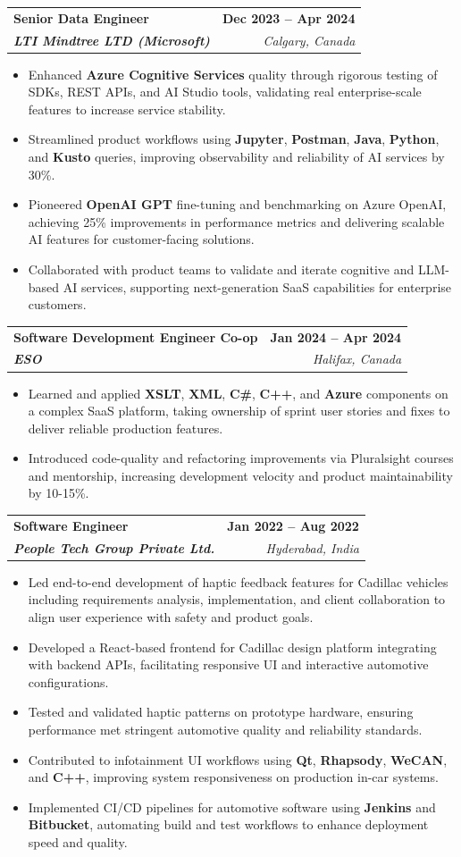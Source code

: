 \documentclass[letterpaper,11pt]{article}
\makeatletter
\newcommand{\resumeItem}[1]{
  \item\small{
    {#1 \vspace{-2pt}}
  }
}
\newcommand{\resumeSubheading}[4]{
  \vspace{-2pt}\item
    \begin{tabular*}{1.0\textwidth}[t]{l@{\extracolsep{\fill}}r}
      \textbf{#1} & \textbf{\small #2} \\
      \textit{\small#3} & \textit{\small #4} \\
    \end{tabular*}\vspace{-7pt}
}
\newcommand{\resumeItemListStart}{\begin{itemize}}
\newcommand{\resumeItemListEnd}{\end{itemize}\vspace{-5pt}}
\makeatother
\begin{document}
    \resumeSubheading
      {\textbf{Senior Data Engineer}}{\textbf{Dec 2023 -- Apr 2024}}
      {\textbf{LTI Mindtree LTD (Microsoft)}}{Calgary, Canada}
      \resumeItemListStart
        \resumeItem{Enhanced \textbf{Azure Cognitive Services} quality through rigorous testing of SDKs, REST APIs, and AI Studio tools, validating real enterprise-scale features to increase service stability.}
        \resumeItem{Streamlined product workflows using \textbf{Jupyter}, \textbf{Postman}, \textbf{Java}, \textbf{Python}, and \textbf{Kusto} queries, improving observability and reliability of AI services by 30\%.}
        \resumeItem{Pioneered \textbf{OpenAI GPT} fine-tuning and benchmarking on Azure OpenAI, achieving 25\% improvements in performance metrics and delivering scalable AI features for customer-facing solutions.}
        \resumeItem{Collaborated with product teams to validate and iterate cognitive and LLM-based AI services, supporting next-generation SaaS capabilities for enterprise customers.}
      \resumeItemListEnd
    
    \resumeSubheading
      {\textbf{Software Development Engineer Co-op}}{\textbf{Jan 2024 -- Apr 2024}}
      {\textbf{ESO}}{Halifax, Canada}
      \resumeItemListStart
        \resumeItem{Learned and applied \textbf{XSLT}, \textbf{XML}, \textbf{C\#}, \textbf{C++}, and \textbf{Azure} components on a complex SaaS platform, taking ownership of sprint user stories and fixes to deliver reliable production features.}
        \resumeItem{Introduced code-quality and refactoring improvements via Pluralsight courses and mentorship, increasing development velocity and product maintainability by 10-15\%.}
      \resumeItemListEnd

    \resumeSubheading
      {\textbf{Software Engineer}}{\textbf{Jan 2022 -- Aug 2022}}
      {\textbf{People Tech Group Private Ltd.}}{Hyderabad, India}
      \resumeItemListStart
        \resumeItem{Led end-to-end development of haptic feedback features for Cadillac vehicles including requirements analysis, implementation, and client collaboration to align user experience with safety and product goals.}
        \resumeItem{Developed a React-based frontend for Cadillac design platform integrating with backend APIs, facilitating responsive UI and interactive automotive configurations.}
        \resumeItem{Tested and validated haptic patterns on prototype hardware, ensuring performance met stringent automotive quality and reliability standards.}
        \resumeItem{Contributed to infotainment UI workflows using \textbf{Qt}, \textbf{Rhapsody}, \textbf{WeCAN}, and \textbf{C++}, improving system responsiveness on production in-car systems.}
        \resumeItem{Implemented CI/CD pipelines for automotive software using \textbf{Jenkins} and \textbf{Bitbucket}, automating build and test workflows to enhance deployment speed and quality.}
      \resumeItemListEnd
\end{document}
